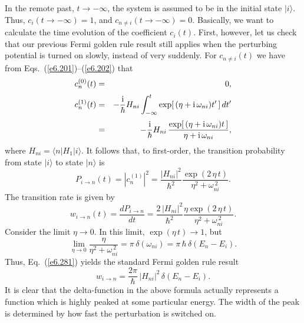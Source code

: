 In the remote past, $t\rightarrow -\infty$, the system is assumed to
be in the initial state $|i\rangle$. Thus, $c_i(t\rightarrow-\infty) =1$,
and $c_{n\neq i}(t\rightarrow -\infty) = 0$. Basically, we want to
calculate the time evolution of the coefficient $c_i(t)$.
First, however, let us check that our previous Fermi golden rule result
still applies  when the perturbing potential is turned on slowly,
instead of very suddenly. For $c_{n \neq i}(t)$ we have from Eqs.~(\ref{e6.201})--(\ref{e6.202}) that
\begin{eqnarray}
c_n^{(0)}(t) &=& 0,\\[0.5ex]
c_n^{(1)}(t) &=& - \frac{\rm i}{\hbar} H_{ni} \int_{-\infty}^t 
\exp[\,(\eta + {\rm i}\,\omega_{ni} ) t'\,]\,dt'\nonumber\\[0.5ex]
&=& -\frac{\rm i}{\hbar} H_{ni}\, \frac{
\exp[\,(\eta + {\rm i}\,\omega_{ni} ) t\,]}{\eta +{\rm i}\,\omega_{ni}},
\end{eqnarray}
where $H_{ni} = \langle n|H_1|i\rangle$. 
It follows that, to first-order, the transition probability from state $|i\rangle$ to state $|n\rangle$ is
\begin{equation}
P_{i\rightarrow n}(t) = |c_n^{(1)}|^2 = \frac{|H_{ni}|^2}{\hbar^2}
\frac{\exp(2\, \eta\, t)}{\eta^2 + \omega_{ni}^{~2}}.
\end{equation}
The transition rate is given by
\begin{equation}\label{e6.281}
w_{i\rightarrow n}(t) = \frac{dP_{i\rightarrow n}}{dt} = 
\frac{2 \,|H_{ni}|^2}{\hbar^2}
\frac{\eta \exp(2 \,\eta \,t)}{\eta^2 + \omega_{ni}^{~2}}.
\end{equation}
Consider the limit $\eta\rightarrow 0$. In this limit,
$\exp(\eta\, t)\rightarrow 1$, but
\begin{equation}
\lim_{\eta\rightarrow 0} \frac{\eta}{\eta^2+ \omega_{ni}^{~2}}
=\pi\,\delta(\omega_{ni}) = \pi\,\hbar \,\delta(E_n - E_i).
\end{equation}
Thus, Eq.~(\ref{e6.281}) yields the standard Fermi golden rule result
\begin{equation}
w_{i\rightarrow n} = \frac{2\pi}{\hbar} \,|H_{ni}|^2 \,\delta(E_n - E_i).
\end{equation}
It is clear that the delta-function in the above formula actually represents
a function which is highly peaked at some particular energy. The width
of the peak is determined by how fast the perturbation is switched on.

